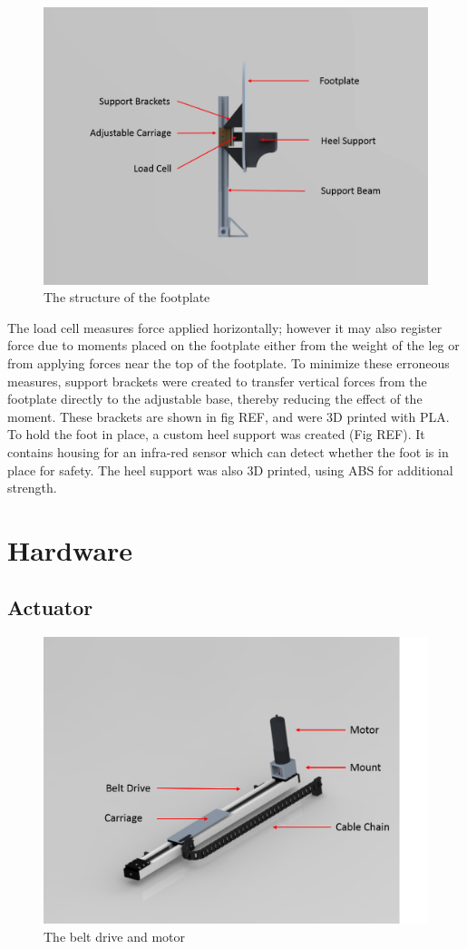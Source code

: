 \documentclass[12pt]{report}
\begin{document}
	
	\begin{figure}[h] 
		\centering
		\includegraphics[width=0.5\linewidth]{footplate_label}
		\caption{The structure of the footplate}
		\label{fig:footplate_label}
	\end{figure}
	

	The load cell measures force applied horizontally; however it may also register force due to moments placed on the footplate either from the weight of the leg or from applying forces near the top of the footplate. To minimize these erroneous measures, support brackets were created to transfer vertical forces from the footplate directly to the adjustable base, thereby reducing the effect of the moment. These brackets are shown in fig REF, and were 3D printed with PLA. To hold the foot in place, a custom heel support was created (Fig REF). It contains housing for an infra-red sensor which can detect whether the foot is in place for safety. The heel support was also 3D printed, using ABS for additional strength. 
	
	\section{Hardware}
		\subsection{Actuator}	
		
	\begin{figure}[h] 
		\centering
		\includegraphics[width=0.75\linewidth]{actuator}
		\caption{The belt drive and motor}
		\label{fig:actuator}
	\end{figure}
		
\end{document}
